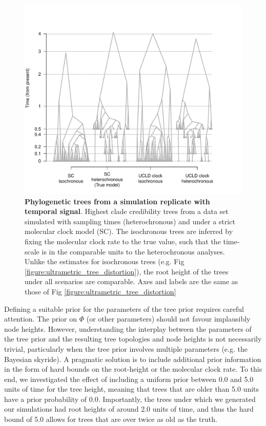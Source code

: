 \documentclass[10pt,letterpaper]{article}
\begin{document}
\begin{figure}[!h]
	\begin{center}
		\includegraphics[width=15cm]{sandbox_figures/tree_distortion_heterochronous.pdf}\newline
		\vspace{-0.5cm}
		\caption{\textbf{Phylogenetic trees from a simulation replicate with temporal signal}. Highest clade credibility trees from a data set simulated with sampling times (heterochronous) and under a strict molecular clock model (SC). The isochronous trees are inferred by fixing the molecular clock rate to the true value, such that the time-scale is in the comparable units to the heterochronous analyses. Unlike the estimates for isochronous trees (e.g. Fig \ref{figure:ultrametric_tree_distortion}), the root height of the trees  under all scenarios are comparable. Axes and labels are the same as those of Fig \ref{figure:ultrametric_tree_distortion}}
		\label{figure:heterochronous_tree_distortion}
	\end{center}
\end{figure}


Defining a suitable prior for the parameters of the tree prior requires careful attention. The prior on $\Phi$ (or other parameters) should not favour implausibly node heights. However, understanding the interplay between the parameters of the tree prior and the resulting tree topologies and node heights is not necessarily trivial, particularly when the tree prior involves multiple parameters (e.g. the Bayesian skyride). A pragmatic solution is to include additional prior information in the form of hard bounds on the root-height or the molecular clock rate. To this end, we investigated the effect of including a uniform prior between 0.0 and 5.0 units of time for the tree height, meaning that trees that are older than 5.0 units have a prior probability of 0.0. Importantly, the trees under which we generated our simulations had root heights of around 2.0 units of time, and thus the hard bound of 5.0 allows for trees that are over twice as old as the truth. 
\end{document}
